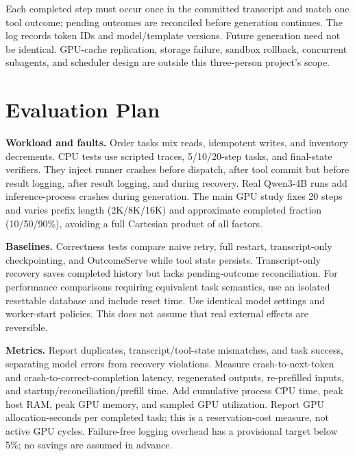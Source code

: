 \documentclass{article}
\begin{document}
Each completed step must occur once in the committed transcript and match one tool outcome; pending outcomes are reconciled before generation continues. The log records token IDs and model/template versions. Future generation need not be identical. GPU-cache replication, storage failure, sandbox rollback, concurrent subagents, and scheduler design are outside this three-person project's scope.

\section{Evaluation Plan}
\textbf{Workload and faults.} Order tasks mix reads, idempotent writes, and inventory decrements. CPU tests use scripted traces, 5/10/20-step tasks, and final-state verifiers. They inject runner crashes before dispatch, after tool commit but before result logging, after result logging, and during recovery. Real Qwen3-4B runs add inference-process crashes during generation. The main GPU study fixes 20 steps and varies prefix length (2K/8K/16K) and approximate completed fraction (10/50/90\%), avoiding a full Cartesian product of all factors.

\textbf{Baselines.} Correctness tests compare naive retry, full restart, transcript-only checkpointing, and OutcomeServe while tool state persists. Transcript-only recovery saves completed history but lacks pending-outcome reconciliation. For performance comparisons requiring equivalent task semantics, use an isolated resettable database and include reset time. Use identical model settings and worker-start policies. This does not assume that real external effects are reversible.

\textbf{Metrics.} Report duplicates, transcript/tool-state mismatches, and task success, separating model errors from recovery violations. Measure crash-to-next-token and crash-to-correct-completion latency, regenerated outputs, re-prefilled inputs, and startup/reconciliation/prefill time. Add cumulative process CPU time, peak host RAM, peak GPU memory, and sampled GPU utilization. Report GPU allocation-seconds per completed task; this is a reservation-cost measure, not active GPU cycles. Failure-free logging overhead has a provisional target below 5\%; no savings are assumed in advance.
\end{document}
